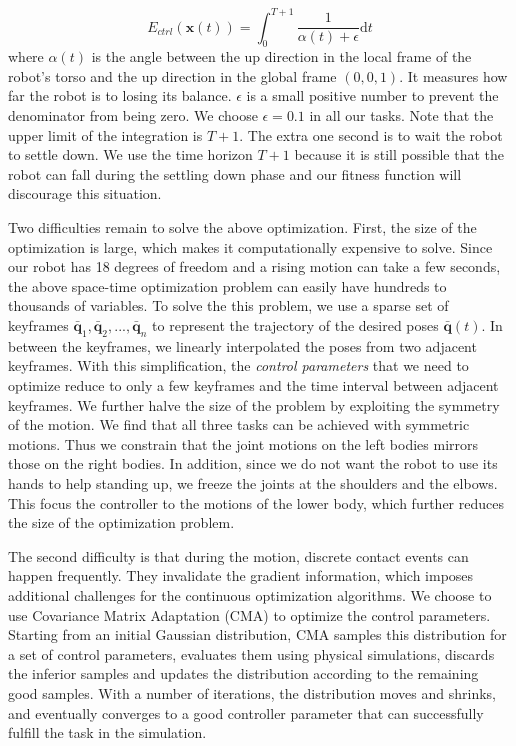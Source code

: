 \begin{equation}
  E_{ctrl}(\mathbf{x}(t))=\int_0^{T+1} \frac{1}{\alpha(t)+\epsilon}\mathrm{d}t
  \label{eqn:controllerObj}
\end{equation}
where $\alpha(t)$ is the angle between the up direction in the local frame of the robot's torso and the up direction in the global frame $(0,0,1)$. It measures how far the robot is to losing its balance. $\epsilon$ is a small positive number to prevent the denominator from being zero. We choose $\epsilon=0.1$ in all our tasks. Note that the upper limit of the integration is $T+1$. The extra one second is to wait the robot to settle down. We use the time horizon $T+1$ because it is still possible that the robot can fall during the settling down phase and our fitness function will discourage this situation.

Two difficulties remain to solve the above optimization. First, the size of the optimization is large, which makes it computationally expensive to solve. Since our robot has 18 degrees of freedom and a rising motion can take a few seconds, the above space-time optimization problem can easily have hundreds to thousands of variables. To solve the this problem, we use a sparse set of keyframes $\bar{\mathbf{q}}_1, \bar{\mathbf{q}}_2, ..., \bar{\mathbf{q}}_n$ to represent the trajectory of the desired poses $\bar{\mathbf{q}}(t)$. In between the keyframes, we linearly interpolated the poses from two adjacent keyframes. With this simplification, the \emph{control parameters} that we need to optimize reduce to only a few keyframes and the time interval between adjacent keyframes. We further halve the size of the problem by exploiting the symmetry of the motion. We find that all three tasks can be achieved with symmetric motions. Thus we constrain that the joint motions on the left bodies mirrors those on the right bodies. In addition, since we do not want the robot to use its hands to help standing up, we freeze the joints at the shoulders and the elbows. This focus the controller to the motions of the lower body, which further reduces the size of the optimization problem.

The second difficulty is that during the motion, discrete contact events can happen frequently. They invalidate the gradient information, which imposes additional challenges for the continuous optimization algorithms. We choose to use Covariance Matrix Adaptation (CMA) \cite{Hansen:2009} to optimize the control parameters. Starting from an initial Gaussian distribution, CMA samples this distribution for a set of control parameters, evaluates them using physical simulations, discards the inferior samples and updates the distribution according to the remaining good samples. With a number of iterations, the distribution moves and shrinks, and eventually converges to a good controller parameter that can successfully fulfill the task in the simulation.

